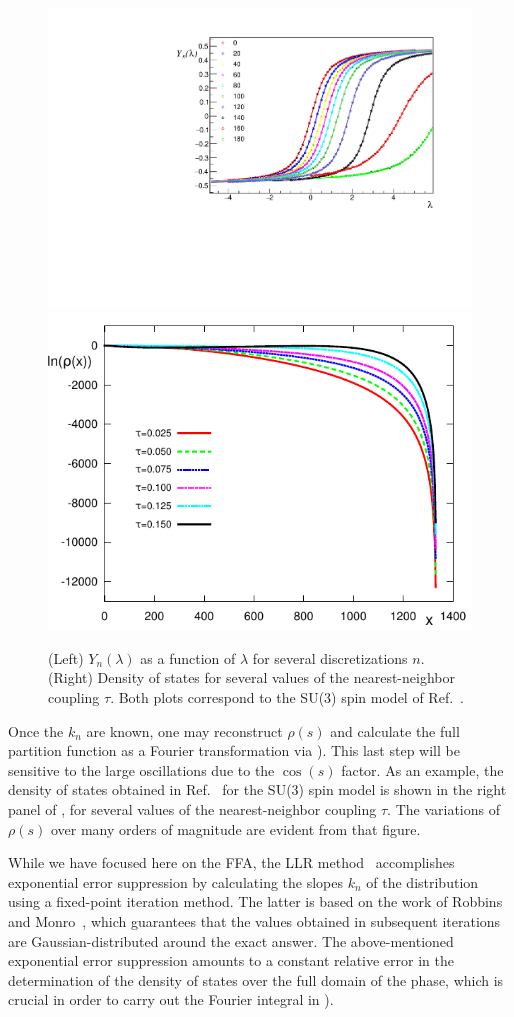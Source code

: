 \documentclass[../main.tex]{subfiles}
\begin{document}
%
\begin{figure}[t]
  \centering
  \includegraphics[width=0.53 \columnwidth]{./2generalformalism/FFAFit_example_new.pdf}
  \includegraphics[width=0.46 \columnwidth]{./2generalformalism/FFArho_tau_new.pdf}
  \caption{\label{fig:FFAPlots} (Left)  $Y_n(\lambda)$ as a function of $\lambda$ for several discretizations $n$.
  (Right) Density of states for several values of the nearest-neighbor coupling $\tau$. Both plots correspond to
  the SU(3) spin model of Ref.~\cite{GIULIANI2016627}.
  }
\end{figure}
%
Once the $k_n$ are known, one may reconstruct $\rho(s)$ and calculate the full partition function as a Fourier transformation via ).
This last step will be sensitive to the large oscillations due to the $\cos(s)$ factor. As an example, the density of states obtained in Ref.~\cite{GIULIANI2016627}
for the SU(3) spin model is shown in the right panel of , for several values of the nearest-neighbor coupling $\tau$. The
variations of $\rho(s)$ over many orders of magnitude are evident from that figure.

While we have focused here on the FFA, the LLR method~\cite{PhysRevLett.109.111601} accomplishes exponential error suppression by
calculating the slopes $k_n$ of the distribution using a fixed-point iteration method. The latter is based on the work of Robbins and Monro~\cite{robbins1951},
which guarantees that the values obtained in subsequent iterations are Gaussian-distributed around the exact answer.
The above-mentioned exponential error suppression amounts to a constant relative error in the determination of the density of states over the full domain
of the phase, which is crucial in order to carry out the Fourier integral in ).
\end{document}
